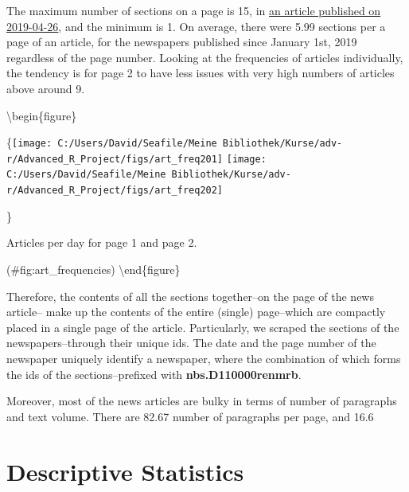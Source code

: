 \documentclass[
  12pt,
]{article}
\begin{document}
The maximum number of sections on a page is 15, in \href{http://paper.people.com.cn/rmrb/html/2019-04/26/nbs.D110000renmrb_01.htm}{an article published on 2019-04-26}, and the minimum is 1. On average, there were 5.99 sections per a page of an article, for the newspapers published since January 1st, 2019 regardless of the page number. Looking at the frequencies of articles individually, the tendency is for page 2 to have less issues with very high numbers of articles above around 9.

\textbackslash begin\{figure\}

\{\centering \texttt{[image: C:/Users/David/Seafile/Meine Bibliothek/Kurse/adv-r/Advanced\_R\_Project/figs/art\_freq201]} \texttt{[image: C:/Users/David/Seafile/Meine Bibliothek/Kurse/adv-r/Advanced\_R\_Project/figs/art\_freq202]}

\}

\caption{Articles per day for page 1 and page 2.}

(\#fig:art\_frequencies)
\textbackslash end\{figure\}

Therefore, the contents of all the sections together--on the page of the news article-- make up the contents of the entire (single) page--which are compactly placed in a single page of the article. Particularly, we scraped the sections of the newspapers--through their unique ids. The date and the page number of the newspaper uniquely identify a newspaper, where the combination of which forms the ids of the sections--prefixed with \textbf{nbs.D110000renmrb}.

Moreover, most of the news articles are bulky in terms of number of paragraphs and text volume. There are 82.67 number of paragraphs per page, and 16.6

\hypertarget{descriptive-statistics}{%
\section{Descriptive Statistics}\label{descriptive-statistics}}
\end{document}
